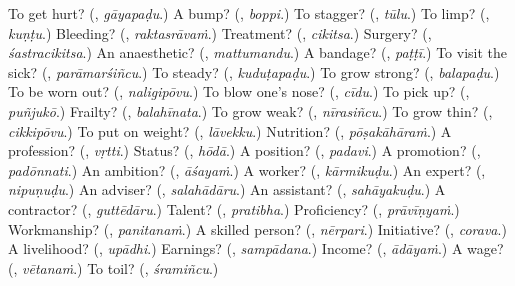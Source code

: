\begin{tcolorbox}[breakable,colback=teal!4,colframe=teal!35!black,title={Before you move on}]
To get hurt? (\textbf{}, \emph{gāyapaḍu}.) A bump? (\textbf{}, \emph{boppi}.) To stagger? (\textbf{}, \emph{tūlu}.) To limp? (\textbf{}, \emph{kuṇṭu}.) Bleeding? (\textbf{}, \emph{raktasrāvaṁ}.) Treatment? (\textbf{}, \emph{cikitsa}.) Surgery? (\textbf{}, \emph{śastracikitsa}.) An anaesthetic? (\textbf{}, \emph{mattumandu}.) A bandage? (\textbf{}, \emph{paṭṭī}.) To visit the sick? (\textbf{}, \emph{parāmarśiñcu}.) To steady? (\textbf{}, \emph{kuduṭapaḍu}.) To grow strong? (\textbf{}, \emph{balapaḍu}.) To be worn out? (\textbf{}, \emph{naligipōvu}.) To blow one's nose? (\textbf{}, \emph{cīdu}.) To pick up? (\textbf{}, \emph{puñjukō}.) Frailty? (\textbf{}, \emph{balahīnata}.) To grow weak? (\textbf{}, \emph{nīrasiñcu}.) To grow thin? (\textbf{}, \emph{cikkipōvu}.) To put on weight? (\textbf{}, \emph{lāvekku}.) Nutrition? (\textbf{}, \emph{pōṣakāhāraṁ}.) A profession? (\textbf{}, \emph{vṛtti}.) Status? (\textbf{}, \emph{hōdā}.) A position? (\textbf{}, \emph{padavi}.) A promotion? (\textbf{}, \emph{padōnnati}.) An ambition? (\textbf{}, \emph{āśayaṁ}.) A worker? (\textbf{}, \emph{kārmikuḍu}.) An expert? (\textbf{}, \emph{nipuṇuḍu}.) An adviser? (\textbf{}, \emph{salahādāru}.) An assistant? (\textbf{}, \emph{sahāyakuḍu}.) A contractor? (\textbf{}, \emph{guttēdāru}.) Talent? (\textbf{}, \emph{pratibha}.) Proficiency? (\textbf{}, \emph{prāvīṇyaṁ}.) Workmanship? (\textbf{}, \emph{panitanaṁ}.) A skilled person? (\textbf{}, \emph{nērpari}.) Initiative? (\textbf{}, \emph{corava}.) A livelihood? (\textbf{}, \emph{upādhi}.) Earnings? (\textbf{}, \emph{sampādana}.) Income? (\textbf{}, \emph{ādāyaṁ}.) A wage? (\textbf{}, \emph{vētanaṁ}.) To toil? (\textbf{}, \emph{śramiñcu}.)
\end{tcolorbox}

